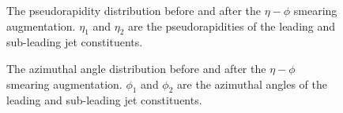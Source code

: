 \documentclass[12pt]{article}
\begin{document}
		\begin{figure}[htpb]
			\centering
			\caption{The pseudorapidity distribution before and after the $\eta-\phi$ smearing augmentation. $\eta_1$ and $\eta_2$ are the pseudorapidities of the leading and sub-leading jet constituents.}
			\label{fig:jet_constituent_eta_distribution}
		\end{figure}
		\begin{figure}[htpb]
			\centering
			\caption{The azimuthal angle distribution before and after the $\eta-\phi$ smearing augmentation. $\phi_1$ and $\phi_2$ are the azimuthal angles of the leading and sub-leading jet constituents.}
			\label{fig:jet_constituent_phi_distribution}
		\end{figure}
\end{document}
